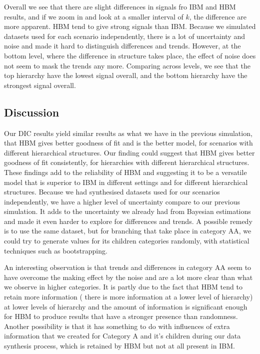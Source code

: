 		\newpara
		
		Overall we see that there are slight differences in signals fro IBM and HBM results, and if we zoom in and look at a smaller interval of $k$, the difference are more apparent. HBM tend to give strong signals than IBM. Because we simulated datasets used for each scenario independently, there is a lot of uncertainty and noise and made it hard to distinguish differences and trends. However, at the bottom level, where the difference in structure takes place, the effect of noise does not seem to mask the trends any more. Comparing across levels, we see that the top hierarchy have the lowest signal overall, and the bottom hierarchy have the strongest signal overall. 
		
		\subsection{Discussion}
		
		Our DIC results yield similar results as what we have in the previous simulation, that HBM gives better goodness of fit and is the better model, for scenarios with different hierarchical structures. Our finding could suggest that HBM gives better goodness of fit consistently, for hierarchies with different hierarchical structures. These findings add to the reliability of HBM and suggesting it to be a versatile model that is superior to IBM in different settings and for different hierarchical structures. Because we had synthesised datasets used for our scenarios independently, we have a higher level of uncertainty compare to our previous simulation. It adds to the uncertainty we already had from Bayesian estimations and made it even harder to explore for differences and trends. A possible remedy is to use the same dataset, but for branching that take place in category AA, we could try to generate values for its children categories randomly, with statistical techniques such as bootstrapping. 
		
		\newpara
		
		An interesting observation is that trends and differences in category AA seem to have overcome the making effect by the noise and are a lot more clear than what we observe in higher categories. It is partly due to the fact that HBM tend to retain more information ( there is more information at a lower level of hierarchy) at lower levels of hierarchy and the amount of information is significant enough for HBM to produce results that have a stronger presence than randomness. Another possibility is that it has something to do with influences of extra information that we created for Category A and it's children during our data synthesis process, which is retained by HBM but not at all present in IBM. 
		
		
		
